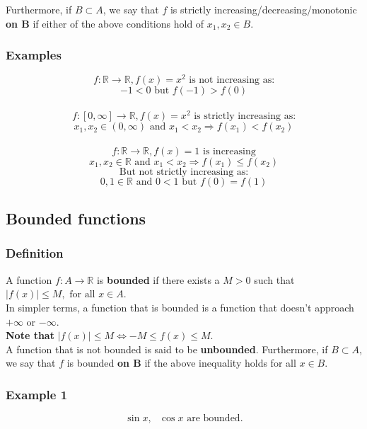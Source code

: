 \documentclass[11pt]{article}
\begin{document}
Furthermore, if \(B \subset A\), we say that \(f\) is strictly increasing/decreasing/monotonic \textbf{on B} if either of the above conditions hold of \(x_1, x_2 \in B\).

\newpage

\subsubsection{Examples}
\label{sec:org2cb9171}

\[f : \mathbb{R} \rightarrow \mathbb{R}, f(x) = x^2 \text{ is not increasing as:}\]
\[-1 < 0 \text{ but } f(-1) > f(0)\]
\\[0pt]

\[f : [0, \infty] \rightarrow \mathbb{R}, f(x) = x^2 \text{ is strictly increasing as:}\]
\[x_1, x_2 \in (0, \infty) \text{ and } x_1 < x_2 \Rightarrow f(x_1) < f(x_2)\]
\\[0pt]

\[f : \mathbb{R} \rightarrow \mathbb{R}, f(x) = 1 \text{ is increasing}\]
\[x_1, x_2 \in \mathbb{R} \text{ and } x_1 < x_2 \Rightarrow f(x_1) \le f(x_2)\]
\[\text{But not strictly increasing as:}\]
\[0, 1 \in \mathbb{R} \text{ and } 0 < 1 \text{ but } f(0) = f(1)\]


\subsection{Bounded functions}
\label{sec:orgdb9501d}

\subsubsection{Definition}
\label{sec:org2702b36}
A function \(f : A \rightarrow \mathbb{R}\) is \textbf{bounded} if there exists a \(M > 0\) such that \(|f(x)| \le M, \text{ for all } x \in A\).
\\[0pt]

In simpler terms, a function that is bounded is a function that doesn't approach \(+\infty\) or \(-\infty\).
\\[0pt]

\textbf{Note that} \(|f(x)| \le M \Leftrightarrow - M \le f(x) \le M\).
\\[0pt]

A function that is not bounded is said to be \textbf{unbounded}. Furthermore, if \(B \subset A\), we say that \(f\) is bounded \textbf{on B} if the above inequality holds for all \(x \in B\).

\subsubsection{Example 1}
\label{sec:org1b096c5}
\[\sin x, \text{ } \cos x \text{ are bounded.}\]
\end{document}
